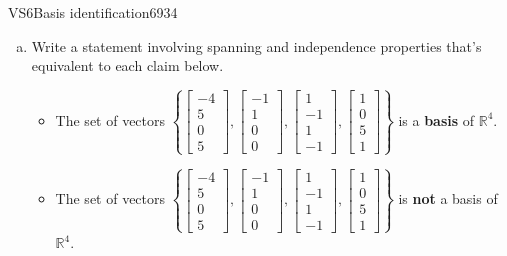 \begin{exercise}{VS6}{Basis identification}{6934} 
\begin{exerciseStatement} 

\begin{enumerate}[(a)]
\item  

 Write a statement involving spanning and independence properties that's equivalent to each claim below. 

 

\begin{itemize}
\item  

 The set of vectors \(\left\{ \left[\begin{array}{c}
-4 \\
5 \\
0 \\
5
\end{array}\right] , \left[\begin{array}{c}
-1 \\
1 \\
0 \\
0
\end{array}\right] , \left[\begin{array}{c}
1 \\
-1 \\
1 \\
-1
\end{array}\right] , \left[\begin{array}{c}
1 \\
0 \\
5 \\
1
\end{array}\right] \right\}\) is a \textbf{basis} of \(\mathbb{R}^4\). 

 
\item  

 The set of vectors \(\left\{ \left[\begin{array}{c}
-4 \\
5 \\
0 \\
5
\end{array}\right] , \left[\begin{array}{c}
-1 \\
1 \\
0 \\
0
\end{array}\right] , \left[\begin{array}{c}
1 \\
-1 \\
1 \\
-1
\end{array}\right] , \left[\begin{array}{c}
1 \\
0 \\
5 \\
1
\end{array}\right] \right\}\) is \textbf{not} a basis of \(\mathbb{R}^4\). 


\end{itemize}
\end{enumerate}
\end{exerciseStatement}
\end{exercise}
